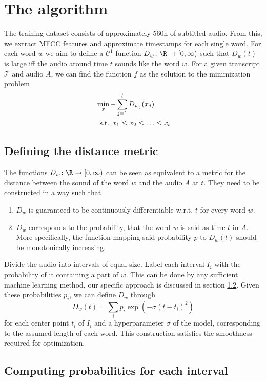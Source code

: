 \chapter{The algorithm}

The training dataset consists of approximately 560h of subtitled audio. From this, we extract MFCC features and approximate timestamps for each single word. For each word $w$ we aim to define a $\mathcal{C}^1$ function \(D_w\colon \R \to \lbrack 0, \infty)\) such that $D_w(t)$ is large iff the audio around time $t$ sounds like the word $w$. For a given transcript $\mathcal{T}$ and audio $A$, we can find the function $f$ as the solution to the minimization problem
\begin{align*}
	&\min_x -\sum_{j=1}^l D_{w_j}(x_j)\\
	&\hspace{0.5em}\text{s.t. }x_1\leq x_2\leq \dotsc\leq x_l
\end{align*}

\section{Defining the distance metric}

The functions \(D_w\colon \R \to \lbrack 0, \infty)\) can be seen as equivalent to a metric for the distance between the sound of the word $w$ and the audio $A$ at $t$. They need to be constructed in a way such that
\begin{enumerate}
	\item $D_w$ is guaranteed to be continuously differentiable w.r.t. $t$ for every word $w$.
	\item $D_w$ corresponds to the probability, that the word $w$ is said as time $t$ in $A$. More specifically, the function mapping said probability $p$ to $D_w(t)$ should be monotonically increasing.
\end{enumerate}

Divide the audio into intervals of equal size. Label each interval $I_i$ with the probability of it containing a part of $w$. This can be done by any sufficient machine learning method, our specific approach is discussed in section \ref{interval_word_prob}. Given these probabilities $p_i$, we can define $D_w$ through
\[
	D_w(t) = \sum_i p_i \exp(-\sigma(t-t_i)^2)
\]
for each center point $t_i$ of $I_i$ and a hyperparameter $\sigma$ of the model, corresponding to the assumed length of each word. This construction satisfies the smoothness required for optimization.

\section{Computing probabilities for each interval}
\label{interval_word_prob}

